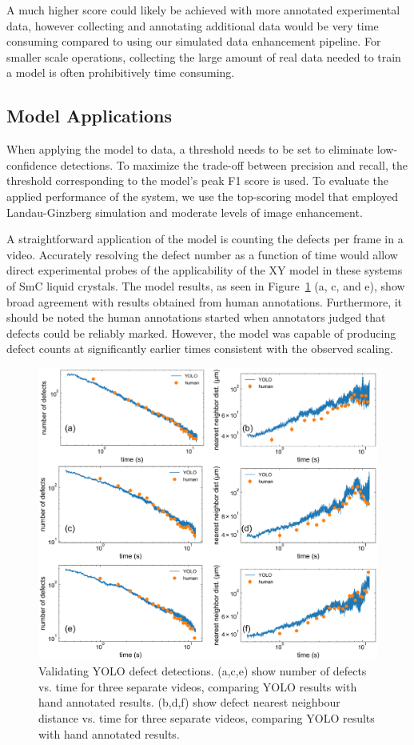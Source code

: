 \documentclass[twoside,twocolumn,9pt]{article}
\begin{document}
A much higher score could likely be achieved with more annotated experimental data, however collecting and annotating additional data would be very time consuming compared to using our simulated data enhancement pipeline. For smaller scale operations, collecting the large amount of real data needed to train a model is often prohibitively time consuming.

\subsection{Model Applications}

When applying the model to data, a threshold needs to be set to eliminate low-confidence detections. To maximize the trade-off between precision and recall, the threshold corresponding to the model's peak F1 score is used. To evaluate the applied performance of the system, we use the top-scoring model that employed Landau-Ginzberg simulation and moderate levels of image enhancement.%

A straightforward application of the model is counting the defects per frame in a video. Accurately resolving the defect number as a function of time would allow direct experimental probes of the applicability of the XY model in these systems of SmC liquid crystals. The model results, as seen in Figure~\ref{fig:HumanVMachine} (a, c, and e), show broad agreement with results obtained from human annotations. Furthermore, it should be noted the human annotations started when annotators judged that defects could be reliably marked. However, the model was capable of producing defect counts at significantly earlier times consistent with the observed scaling.
\begin{figure}[h!]
\centering
  \includegraphics[width=.8\textwidth]{humanVmachineAllR.png}
  \caption{Validating YOLO defect detections. (a,c,e) show number of defects vs. time for three separate videos, comparing YOLO results with hand annotated results. (b,d,f) show defect nearest neighbour distance vs. time for three separate videos, comparing YOLO results with hand annotated results.}
  \label{fig:HumanVMachine}
\end{figure}
\end{document}
